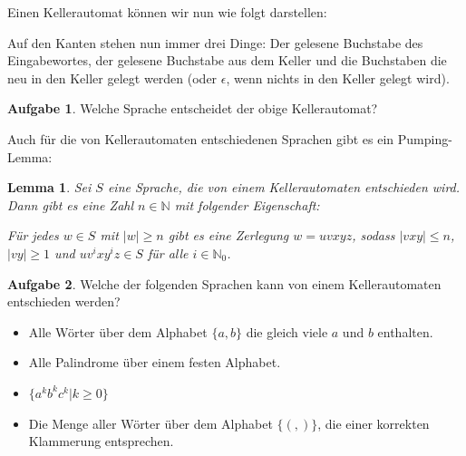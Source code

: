 \documentclass[a4paper,ngerman,12pt]{scrartcl}
\newcommand{\IN}{\mathbb{N}}
\newcommand{\INo}{\mathbb{N}_0}
\newcommand{\abs}[1]{\left|#1\right|}
\theoremstyle{definition}
\newtheorem{aufg}{Aufgabe}
\theoremstyle{plain}
\newtheorem{lemma}[defn]{Lemma}
\theoremstyle{remark}
\begin{document}
Einen Kellerautomat können wir nun wie folgt darstellen:
\begin{center}
\end{center}
Auf den Kanten stehen nun immer drei Dinge: Der gelesene Buchstabe des Eingabewortes, der gelesene Buchstabe aus dem Keller und die Buchstaben die neu in den Keller gelegt werden (oder $\epsilon$, wenn nichts in den Keller gelegt wird).

\begin{aufg}
	Welche Sprache entscheidet der obige Kellerautomat?
\end{aufg}

Auch für die von Kellerautomaten entschiedenen Sprachen gibt es ein Pumping-Lemma:

\begin{lemma}
	Sei $S$ eine Sprache, die von einem Kellerautomaten entschieden wird. Dann gibt es eine Zahl $n \in \IN$ mit folgender Eigenschaft:
	
	Für jedes $w \in S$ mit $\abs{w} \geq n$ gibt es eine Zerlegung $w=uvxyz$, sodass $\abs{vxy} \leq n$, $\abs{vy} \geq 1$ und $uv^ixy^iz \in S$ für alle $i \in \INo$.
\end{lemma}

\begin{aufg}
	Welche der folgenden Sprachen kann von einem Kellerautomaten entschieden werden?
	\begin{itemize}
		\item Alle Wörter über dem Alphabet $\{a,b\}$ die gleich viele $a$ und $b$ enthalten.
		\item Alle Palindrome über einem festen Alphabet.
		\item $\{a^kb^kc^k | k \geq 0\}$
		\item Die Menge aller Wörter über dem Alphabet $\{(,)\}$, die einer korrekten Klammerung entsprechen.
	\end{itemize}
\end{aufg}
\end{document}
